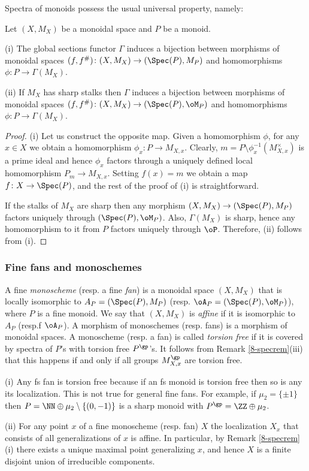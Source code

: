 \documentclass[10pt]{../fichiers-configuration-latex/smfart}
\begin{document}
Spectra of monoids possess the usual universal property, namely:

\begin{lemma2}\label{8-monoidsplem} Let $(X,M_X)$ be a monoidal
space and $P$ be a monoid.

(i) The global sections functor $\Gamma$ induces
a bijection between morphisms of monoidal spaces
$(f,f^\#){\colon}(X,M_X)\to(\Spec(P),M_P)$ and homomorphisms
$\phi{\colon}P\to\Gamma(M_X)$.

(ii) If $M_X$ has sharp stalks then $\Gamma$ induces
a bijection between morphisms of monoidal spaces
$(f,f^\#){\colon}(X,M_X)\to(\Spec(P),\oM_P)$ and homomorphisms
$\phi{\colon}P\to\Gamma(M_X)$.  \end{lemma2} \begin{proof} (i)
Let us construct the opposite map. Given a homomorphism $\phi$,
for any $x\in X$ we obtain a homomorphism $\phi_x{\colon}P\to
M_{X,x}$. Clearly, $m=P\setminus\phi_x^{-1}(M^\times_{X,x})$ is a
prime ideal and hence $\phi_x$ factors through a uniquely defined
local homomorphism $P_m\to M_{X,x}$. Setting $f(x)=m$ we obtain
a map $f{\colon}X\to\Spec(P)$, and the rest of the proof of (i)
is straightforward.

If the stalks of $M_X$ are sharp then any morphism
$(X,M_X)\to(\Spec(P),M_P)$ factors uniquely through
$(\Spec(P),\oM_P)$. Also, $\Gamma(M_X)$ is sharp, hence
any homomorphism to it from $P$ factors uniquely through
$\oP$. Therefore, (ii) follows from (i).  \end{proof}

\subsubsection{Fine fans and monoschemes}\label{8-finfansec} A
fine {\em monoscheme} (resp. a fine {\em fan}) is a monoidal space
$(X,{M}_X)$ that is locally isomorphic to $A_P=(\Spec(P),{M}_P)$
(resp. $\oA_P=(\Spec(P),\oM_P)$), where $P$ is a fine monoid. We
say that $(X,M_X)$ is {\em affine} if it is isomorphic to $A_P$
(resp.f $\oA_P$). A morphism of monoschemes (resp. fans) is a
morphism of monoidal spaces. A monoscheme (resp. a fan) is called
{\em torsion free} if it is covered by spectra of $P$'s with torsion
free $P^\gp$'s. It follows from Remark \ref{8-specrem}(iii) that this
happens if and only if all groups $M^\gp_{X,x}$ are torsion free.

\begin{remark2}\label{8-fanrem} (i) Any fs fan is torsion
free because if an fs monoid is torsion free then so is any its
localization. This is not true for general fine fans. For example,
if $\mu_2=\{\pm 1\}$ then $P=\NN\oplus\mu_2\setminus\{(0,-1)\}$
is a sharp monoid with $P^\gp=\ZZ\oplus\mu_2$.

(ii) For any point $x$ of a fine monoscheme (resp. fan) $X$ the
localization $X_x$ that consists of all generalizations of $x$ is
affine. In particular, by Remark \ref{8-specrem}(i) there exists
a unique maximal point generalizing $x$, and hence $X$ is a finite
disjoint union of irreducible components.  \end{remark2}
\end{document}
